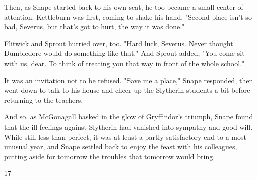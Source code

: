 Then, as Snape started back to his own seat, he too became a small center of attention. Kettleburn was first, coming to shake his hand. "Second place isn't so bad, Severus, but that's got to hurt, the way it was done."

Flitwick and Sprout hurried over, too. "Hard luck, Severus. Never thought Dumbledore would do something like that." And Sprout added, "You come sit with us, dear. To think of treating you that way in front of the whole school."

It was an invitation not to be refused. "Save me a place," Snape responded, then went down to talk to his house and cheer up the Slytherin students a bit before returning to the teachers.

And so, as McGonagall basked in the glow of Gryffindor's triumph, Snape found that the ill feelings against Slytherin had vanished into sympathy and good will. While still less than perfect, it was at least a partly satisfactory end to a most unusual year, and Snape settled back to enjoy the feast with his colleagues, putting aside for tomorrow the troubles that tomorrow would bring.

\sbreak

17



